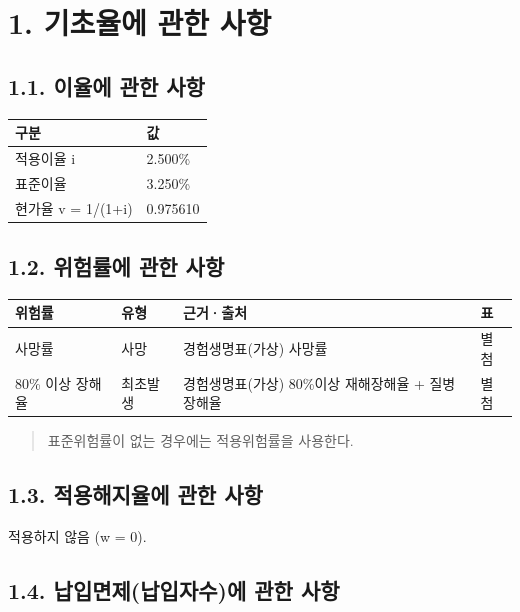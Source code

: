 \documentclass[10pt,a4paper]{article}
\begin{document}
\section*{1. 기초율에 관한 사항}

\subsection*{1.1. 이율에 관한 사항}

\begin{center}\small
\begin{tabular}{|l|l|}
\hline
\textbf{구분} & \textbf{값} \\
\hline
적용이율 i & 2.500\% \\
표준이율 & 3.250\% \\
현가율 v = 1/(1+i) & 0.975610 \\
\hline
\end{tabular}
\end{center}

\subsection*{1.2. 위험률에 관한 사항}

\begin{center}\small
\begin{tabular}{|l|l|l|l|}
\hline
\textbf{위험률} & \textbf{유형} & \textbf{근거·출처} & \textbf{표} \\
\hline
사망률 & 사망 & 경험생명표(가상) 사망률 & 별첨 \\
80\% 이상 장해율 & 최초발생 & 경험생명표(가상) 80\%이상 재해장해율 + 질병장해율 & 별첨 \\
\hline
\end{tabular}
\end{center}

\begin{quote}\small
표준위험률이 없는 경우에는 적용위험률을 사용한다.
\end{quote}

\subsection*{1.3. 적용해지율에 관한 사항}

적용하지 않음 (w = 0).

\subsection*{1.4. 납입면제(납입자수)에 관한 사항}
\end{document}
